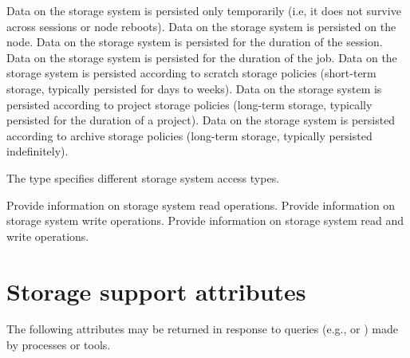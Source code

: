 \begin{constantdesc}
%
Data on the storage system is persisted only temporarily (i.e, it does not survive across sessions or node reboots).
%
Data on the storage system is persisted on the node.
%
Data on the storage system is persisted for the duration of the session.
%
Data on the storage system is persisted for the duration of the job.
%
Data on the storage system is persisted according to scratch storage policies (short-term storage, typically persisted for days to weeks).
%
Data on the storage system is persisted according to project storage policies (long-term storage, typically persisted for the duration of a project).
%
Data on the storage system is persisted according to archive storage policies (long-term storage, typically persisted indefinitely).
%
\end{constantdesc}


The  type specifies different storage system access types.

\begin{constantdesc}
%
Provide information on storage system read operations.
%
Provide information on storage system write operations.
%
Provide information on storage system read and write operations.
%
\end{constantdesc}


\section{Storage support attributes}
\label{api:struct:attributes:pstrg}

The following attributes may be returned in response to queries (e.g.,  or ) made by processes or tools.

%

